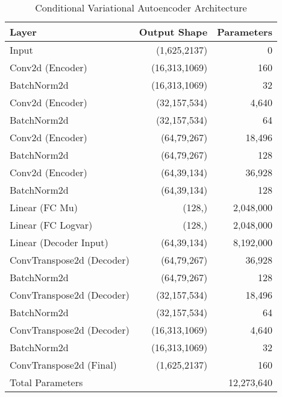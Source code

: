 \begin{table}[!h]
    \centering
    \begin{tabular}{lrr}
        \toprule
        Layer & Output Shape & Parameters \\
        \midrule
        Input & (1,625,2137) & 0 \\
        Conv2d (Encoder) & (16,313,1069) & 160 \\
        BatchNorm2d & (16,313,1069) & 32 \\
        Conv2d (Encoder) & (32,157,534) & 4,640 \\
        BatchNorm2d & (32,157,534) & 64 \\
        Conv2d (Encoder) & (64,79,267) & 18,496 \\
        BatchNorm2d & (64,79,267) & 128 \\
        Conv2d (Encoder) & (64,39,134) & 36,928 \\
        BatchNorm2d & (64,39,134) & 128 \\
        Linear (FC Mu) & (128,) & 2,048,000 \\
        Linear (FC Logvar) & (128,) & 2,048,000 \\
        Linear (Decoder Input) & (64,39,134) & 8,192,000 \\
        ConvTranspose2d (Decoder) & (64,79,267) & 36,928 \\
        BatchNorm2d & (64,79,267) & 128 \\
        ConvTranspose2d (Decoder) & (32,157,534) & 18,496 \\
        BatchNorm2d & (32,157,534) & 64 \\
        ConvTranspose2d (Decoder) & (16,313,1069) & 4,640 \\
        BatchNorm2d & (16,313,1069) & 32 \\
        ConvTranspose2d (Final) & (1,625,2137) & 160 \\
        \midrule
        Total Parameters & & 12,273,640 \\
        \bottomrule
    \end{tabular}
    \caption{Conditional Variational Autoencoder Architecture}
    \label{tab:cvae}
\end{table}



